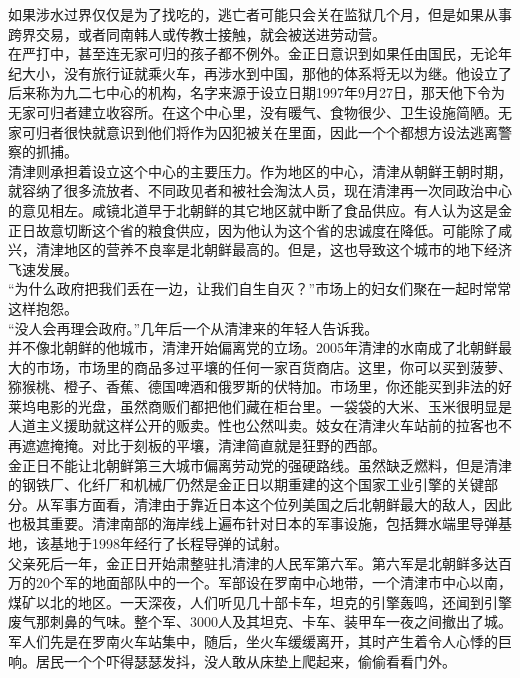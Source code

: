 \begin{multicols}{\theparacolNo}
如果涉水过界仅仅是为了找吃的，逃亡者可能只会关在监狱几个月，但是如果从事跨界交易，或者同南韩人或传教士接触，就会被送进劳动营。\\

在严打中，甚至连无家可归的孩子都不例外。金正日意识到如果任由国民，无论年纪大小，没有旅行证就乘火车，再涉水到中国，那他的体系将无以为继。他设立了后来称为九二七中心的机构，名字来源于设立日期1997年9月27日，那天他下令为无家可归者建立收容所。在这个中心里，没有暖气、食物很少、卫生设施简陋。无家可归者很快就意识到他们将作为囚犯被关在里面，因此一个个都想方设法逃离警察的抓捕。\\

清津则承担着设立这个中心的主要压力。作为地区的中心，清津从朝鲜王朝时期，就容纳了很多流放者、不同政见者和被社会淘汰人员，现在清津再一次同政治中心的意见相左。咸镜北道早于北朝鲜的其它地区就中断了食品供应。有人认为这是金正日故意切断这个省的粮食供应，因为他认为这个省的忠诚度在降低。可能除了咸兴，清津地区的营养不良率是北朝鲜最高的。但是，这也导致这个城市的地下经济飞速发展。\\

“为什么政府把我们丢在一边，让我们自生自灭？”市场上的妇女们聚在一起时常常这样抱怨。\\

“没人会再理会政府。”几年后一个从清津来的年轻人告诉我。\\

并不像北朝鲜的他城市，清津开始偏离党的立场。2005年清津的水南成了北朝鲜最大的市场，市场里的商品多过平壤的任何一家百货商店。这里，你可以买到菠萝、猕猴桃、橙子、香蕉、德国啤酒和俄罗斯的伏特加。市场里，你还能买到非法的好莱坞电影的光盘，虽然商贩们都把他们藏在柜台里。一袋袋的大米、玉米很明显是人道主义援助就这样公开的贩卖。性也公然叫卖。妓女在清津火车站前的拉客也不再遮遮掩掩。对比于刻板的平壤，清津简直就是狂野的西部。\\

金正日不能让北朝鲜第三大城市偏离劳动党的强硬路线。虽然缺乏燃料，但是清津的钢铁厂、化纤厂和机械厂仍然是金正日以期重建的这个国家工业引擎的关键部分。从军事方面看，清津由于靠近日本这个位列美国之后北朝鲜最大的敌人，因此也极其重要。清津南部的海岸线上遍布针对日本的军事设施，包括舞水端里导弹基地，该基地于1998年经行了长程导弹的试射。\\

父亲死后一年，金正日开始肃整驻扎清津的人民军第六军。第六军是北朝鲜多达百万的20个军的地面部队中的一个。军部设在罗南中心地带，一个清津市中心以南，煤矿以北的地区。一天深夜，人们听见几十部卡车，坦克的引擎轰鸣，还闻到引擎废气那刺鼻的气味。整个军、3000人及其坦克、卡车、装甲车一夜之间撤出了城。军人们先是在罗南火车站集中，随后，坐火车缓缓离开，其时产生着令人心悸的巨响。居民一个个吓得瑟瑟发抖，没人敢从床垫上爬起来，偷偷看看门外。\\


\end{multicols}
